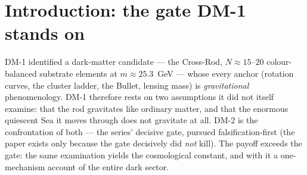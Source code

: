 \documentclass[11pt]{article}
\begin{document}
\begin{abstract}
--- the $O(1)$ selection factor is now a \emph{measured coefficient} awaiting derivation. The
magnitude lands within a factor $\sim$2 of observation at horizon-class $L$.
\textbf{Two conditions are carried open by name:} Gate-1/B1 --- the GR-limit field-equation reduction
must confirm the ground state's exclusion from $T_{\mu\nu}$ (its failure kills the mechanism) --- and
D3(b), the scale selection (first test passed by one reading only; confirmed $w(z)$ evolution at
discovery significance kills \emph{every} enumerated reading --- the registered forward falsifier). All claims carry CONV-004 ledger tags; the paper states exactly what would kill it.
\end{abstract}

\section{Introduction: the gate DM-1 stands on}
DM-1 identified a dark-matter candidate --- the Cross-Rod, $N \approx 15$--$20$ colour-balanced
substrate elements at $m \approx 25.3$~GeV --- whose every anchor (rotation curves, the cluster
ladder, the Bullet, lensing mass) is \emph{gravitational} phenomenology. DM-1 therefore rests on two
assumptions it did not itself examine: that the rod gravitates like ordinary matter, and that the
enormous quiescent Sea it moves through does not gravitate at all. DM-2 is the confrontation of both
--- the series' decisive gate, pursued falsification-first (the paper exists only because the gate
decisively did \emph{not} kill). The payoff exceeds the gate: the same examination yields the
cosmological constant, and with it a one-mechanism account of the entire dark sector.
\end{document}
